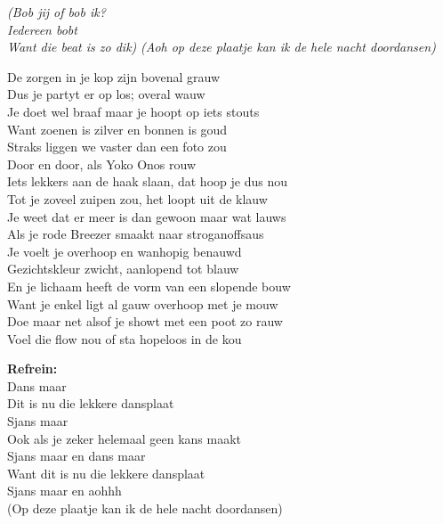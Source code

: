 \textit{(Bob jij of bob ik?\\
Iedereen bobt\\
Want die beat is zo dik)
}
\textit{(Aoh op deze plaatje kan ik de hele nacht doordansen)}

De zorgen in je kop zijn bovenal grauw\\
Dus je partyt er op los; overal wauw\\
Je doet wel braaf maar je hoopt op iets stouts\\
Want zoenen is zilver en bonnen is goud\\
Straks liggen we vaster dan een foto zou\\
Door en door, als Yoko Onos rouw\\
Iets lekkers aan de haak slaan, dat hoop je dus nou\\
Tot je zoveel zuipen zou, het loopt uit de klauw\\
Je weet dat er meer is dan gewoon maar wat lauws\\
Als je rode Breezer smaakt naar stroganoffsaus\\
Je voelt je overhoop en wanhopig benauwd\\
Gezichtskleur zwicht, aanlopend tot blauw\\
En je lichaam heeft de vorm van een slopende bouw\\
Want je enkel ligt al gauw overhoop met je mouw\\
Doe maar net alsof je showt met een poot zo rauw\\
Voel die flow nou of sta hopeloos in de kou

\textbf{Refrein:}\\
Dans maar\\
Dit is nu die lekkere dansplaat\\
Sjans maar\\
Ook als je zeker helemaal geen kans maakt\\
Sjans maar en dans maar\\
Want dit is nu die lekkere dansplaat\\
Sjans maar en aohhh\\
(Op deze plaatje kan ik de hele nacht doordansen)

